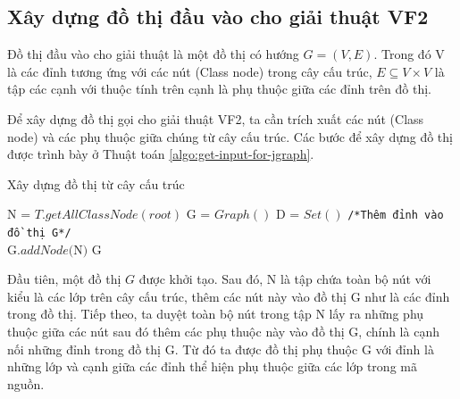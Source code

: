 \documentclass[12pt]{report}
\newenvironment{thuattoan}[1][h]
  {\renewcommand{\algorithmcfname}{Thuật toán}
   \begin{algorithm}[#1]
  }{\end{algorithm}}
\begin{document}
\subsection{Xây dựng đồ thị đầu vào cho giải thuật VF2}
Đồ thị đầu vào cho giải thuật là một đồ thị có hướng $G = (V,E)$. Trong đó V là các đỉnh tương ứng với các nút (Class node) trong cây cấu trúc, $E \subseteq V \times V$ là tập các cạnh với thuộc tính trên cạnh là phụ thuộc giữa các đỉnh trên đồ thị.

\noindent Để xây dựng đồ thị gọi cho giải thuật VF2, ta cần trích xuất các nút (Class node) và các phụ thuộc giữa chúng từ cây cấu trúc. Các bước để xây dựng đồ thị được trình bày ở Thuật toán \ref{algo:get-input-for-jgraph}.
\begin{thuattoan}
	\caption{Xây dựng đồ thị từ cây cấu trúc}
	N = $T.getAllClassNode(root)$\;
	G = $Graph()$\;
	 D = $Set()$\;
	\texttt{/*Thêm đỉnh vào đồ thị G*/\\}
	G.$addNode($N$)$\;
	\Return G\;
	\label{algo:get-input-for-jgraph}
\end{thuattoan}

\noindent Đầu tiên, một đồ thị $G$ được khởi tạo. Sau đó, N là tập chứa toàn bộ nút với kiểu là các lớp trên cây cấu trúc, thêm các nút này vào đồ thị G như là các đỉnh trong đồ thị. Tiếp theo, ta duyệt toàn bộ nút trong tập N lấy ra những phụ thuộc giữa các nút sau đó thêm các phụ thuộc này vào đồ thị G, chính là cạnh nối những đỉnh trong đồ thị G. Từ đó ta được đồ thị phụ thuộc G với đỉnh là những lớp và cạnh giữa các đỉnh thể hiện phụ thuộc giữa các lớp trong mã nguồn.
\end{document}
